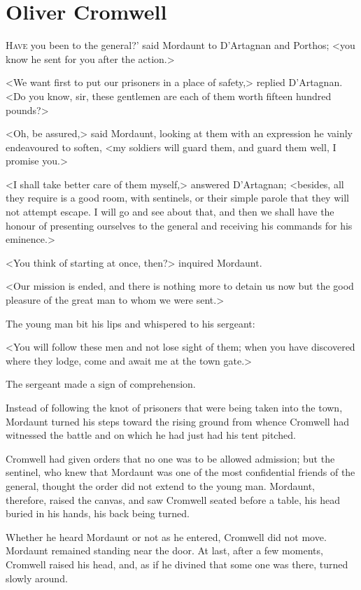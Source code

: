\chapter{Oliver Cromwell}

 \lettrine[ante=`]{H}{ave} you been to the general?' said Mordaunt to D'Artagnan and Porthos; <you know he sent for you after the action.>

\zz
<We want first to put our prisoners in a place of safety,> replied D'Artagnan. <Do you know, sir, these gentlemen are each of them worth fifteen hundred pounds?>

<Oh, be assured,> said Mordaunt, looking at them with an expression he vainly endeavoured to soften, <my soldiers will guard them, and guard them well, I promise you.>

<I shall take better care of them myself,> answered D'Artagnan; <besides, all they require is a good room, with sentinels, or their simple parole that they will not attempt escape. I will go and see about that, and then we shall have the honour of presenting ourselves to the general and receiving his commands for his eminence.>

<You think of starting at once, then?> inquired Mordaunt.

<Our mission is ended, and there is nothing more to detain us now but the good pleasure of the great man to whom we were sent.>

The young man bit his lips and whispered to his sergeant:

<You will follow these men and not lose sight of them; when you have discovered where they lodge, come and await me at the town gate.>

The sergeant made a sign of comprehension.

Instead of following the knot of prisoners that were being taken into the town, Mordaunt turned his steps toward the rising ground from whence Cromwell had witnessed the battle and on which he had just had his tent pitched.

Cromwell had given orders that no one was to be allowed admission; but the sentinel, who knew that Mordaunt was one of the most confidential friends of the general, thought the order did not extend to the young man. Mordaunt, therefore, raised the canvas, and saw Cromwell seated before a table, his head buried in his hands, his back being turned.

Whether he heard Mordaunt or not as he entered, Cromwell did not move. Mordaunt remained standing near the door. At last, after a few moments, Cromwell raised his head, and, as if he divined that some one was there, turned slowly around.

